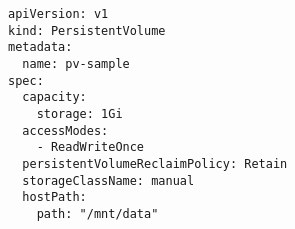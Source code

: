 \begin{verbatim}
apiVersion: v1
kind: PersistentVolume
metadata:
  name: pv-sample
spec:
  capacity:
    storage: 1Gi
  accessModes:
    - ReadWriteOnce
  persistentVolumeReclaimPolicy: Retain
  storageClassName: manual
  hostPath:
    path: "/mnt/data"
\end{verbatim}